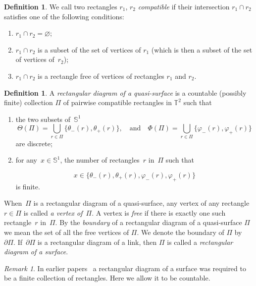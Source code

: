 \documentclass{amsart}
\theoremstyle{theorem}
\theoremstyle{remark}
\newtheorem{rema}[theo]{Remark}
\theoremstyle{definition}
\newtheorem{defi}[theo]{Definition}
\numberwithin{equation}{section}
\numberwithin{figure}{section}
\begin{document}
\begin{defi}
We call two rectangles $r_1$, $r_2$ \emph{compatible} if their intersection $r_1\cap r_2$ satisfies one of the following conditions:
\begin{enumerate}
\item $r_1\cap r_2 = \varnothing$;
\item $r_1 \cap r_2$ is a subset of the set of vertices of $r_1$ (which is then a subset of the set of vertices of~$r_2$);
\item $r_1 \cap r_2$ is a rectangle free of vertices of rectangles $r_1$ and $r_2$.
\end{enumerate}	
\end{defi}

\begin{defi}
\label{def:diagram_quasi-surface}
A \emph{rectangular diagram of a quasi-surface} is a countable (possibly finite) collection $\Pi$ of pairwise
compatible rectangles in $\mathbb T^2$ such that
\begin{enumerate}
\item[(i)]
the two subsets of~$\mathbb S^1$
\begin{equation}\label{ThetaPhi-eq}
\Theta(\Pi)=\bigcup_{r \in \Pi} \{\theta_-(r), \theta_+(r)\},\quad\text{and}\quad
\Phi(\Pi)=\bigcup_{r \in \Pi} \{\varphi_-(r), \varphi_+(r)\}
\end{equation}
are discrete;
\item[(ii)]
for any~$x\in\mathbb S^1$, the number of rectangles~$r$ in~$\Pi$ such that

$$x\in\{\theta_-(r),\theta_+(r),\varphi_-(r),\varphi_+(r)\}$$
is finite.
\end{enumerate}

When~$\Pi$ is a rectangular diagram of a quasi-surface, any vertex of any rectangle~$r\in\Pi$
is called \emph{a vertex of}~$\Pi$. A vertex is \emph{free} if there is exactly one
such rectangle~$r$ in~$\Pi$.
By the \emph{boundary} of a rectangular diagram of a quasi-surface $\Pi$ we mean the set of all the free vertices of $\Pi$.
We denote the boundary of $\Pi$ by $\partial \Pi$. If~$\partial \Pi$ is a rectangular diagram of a link, then $\Pi$ is called a \emph{rectangular diagram of a surface}.
\end{defi}

\begin{rema}
In earlier papers~\cite{Representability,Distinguishing,Basic_moves} a rectangular diagram of a surface was required to be a finite collection of rectangles.
Here we allow it to be countable.
\end{rema}
\end{document}
